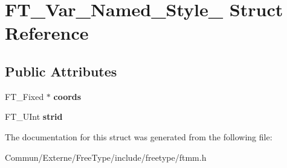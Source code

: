 \hypertarget{struct_f_t___var___named___style__}{}\section{F\+T\+\_\+\+Var\+\_\+\+Named\+\_\+\+Style\+\_\+ Struct Reference}
\label{struct_f_t___var___named___style__}
\subsection*{Public Attributes}
\begin{DoxyCompactItemize}
\item 
F\+T\+\_\+\+Fixed $\ast$ {\bfseries coords}\hypertarget{struct_f_t___var___named___style___a07195d55aee541db651ef3a8b04bb41f}{}\label{struct_f_t___var___named___style___a07195d55aee541db651ef3a8b04bb41f}

\item 
F\+T\+\_\+\+U\+Int {\bfseries strid}\hypertarget{struct_f_t___var___named___style___a7802f6958c6e883bdce16b9931002826}{}\label{struct_f_t___var___named___style___a7802f6958c6e883bdce16b9931002826}

\end{DoxyCompactItemize}


The documentation for this struct was generated from the following file\+:\begin{DoxyCompactItemize}
\item 
Commun/\+Externe/\+Free\+Type/include/freetype/ftmm.\+h\end{DoxyCompactItemize}
